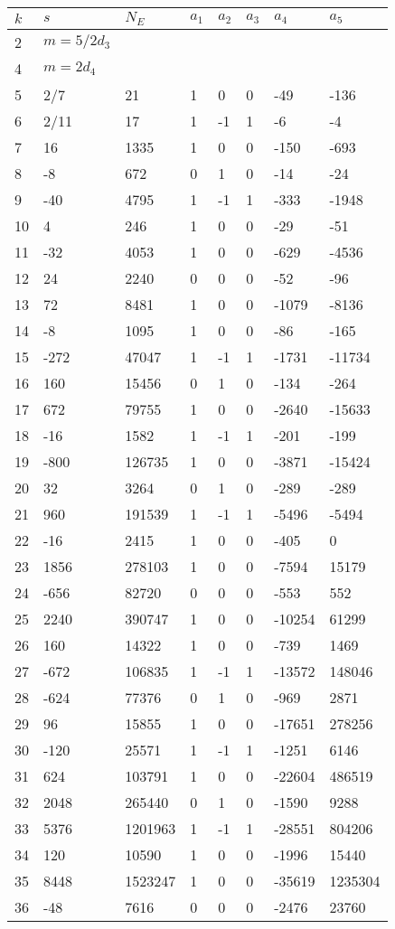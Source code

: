 \documentclass{amsart}
\begin{document}
\begin{longtable}{|l|l|l|lllll|}
\hline
$k$ & $s$ & $N_E$ & $a_1$ & $a_2$ & $a_3$ & $a_4$ & $a_5$\\
\hline
2&$m=5/2d_{3}$&&\multicolumn{5}{c|}{}\\
4&$m=2d_{4}$&&\multicolumn{5}{c|}{}\\
5&2/7&21&1&0&0&-49&-136\\
6&2/11&17&1&-1&1&-6&-4\\
7&16&1335&1&0&0&-150&-693\\
8&-8&672&0&1&0&-14&-24\\
9&-40&4795&1&-1&1&-333&-1948\\
10&4&246&1&0&0&-29&-51\\
11&-32&4053&1&0&0&-629&-4536\\
12&24&2240&0&0&0&-52&-96\\
13&72&8481&1&0&0&-1079&-8136\\
14&-8&1095&1&0&0&-86&-165\\
15&-272&47047&1&-1&1&-1731&-11734\\
16&160&15456&0&1&0&-134&-264\\
17&672&79755&1&0&0&-2640&-15633\\
18&-16&1582&1&-1&1&-201&-199\\
19&-800&126735&1&0&0&-3871&-15424\\
20&32&3264&0&1&0&-289&-289\\
21&960&191539&1&-1&1&-5496&-5494\\
22&-16&2415&1&0&0&-405&0\\
23&1856&278103&1&0&0&-7594&15179\\
24&-656&82720&0&0&0&-553&552\\
25&2240&390747&1&0&0&-10254&61299\\
26&160&14322&1&0&0&-739&1469\\
27&-672&106835&1&-1&1&-13572&148046\\
28&-624&77376&0&1&0&-969&2871\\
29&96&15855&1&0&0&-17651&278256\\
30&-120&25571&1&-1&1&-1251&6146\\
31&624&103791&1&0&0&-22604&486519\\
32&2048&265440&0&1&0&-1590&9288\\
33&5376&1201963&1&-1&1&-28551&804206\\
34&120&10590&1&0&0&-1996&15440\\
35&8448&1523247&1&0&0&-35619&1235304\\
36&-48&7616&0&0&0&-2476&23760\\

\end{longtable}
\end{document}

